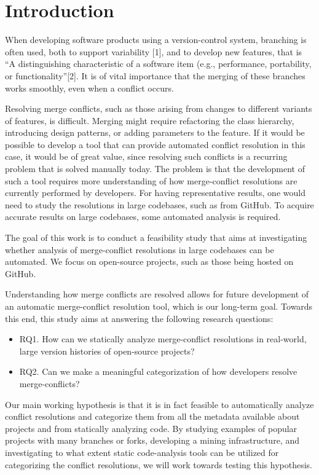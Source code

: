 \chapter{Introduction}
\setlength{\parindent}{0pt}
When developing software products using a version-control system, branching is often used, both to support variability [1], and to develop new features, that is “A distinguishing characteristic of a software item (e.g., performance, portability, or functionality”[2]. It is of vital importance that the merging of these branches works smoothly, even when a conflict occurs.

Resolving merge conflicts, such as those arising from changes to different variants of features, is difficult. Merging might require refactoring the class hierarchy, introducing design patterns, or adding parameters to the feature. If it would be possible to develop a tool that can provide automated conflict resolution in this case, it would be of great value, since resolving such conflicts is a recurring problem that is solved manually today. The problem is that the development of such a tool requires more understanding of how merge-conflict resolutions are currently performed by developers. For having representative results, one would need to study the resolutions in large codebases, such as from GitHub. To acquire accurate results on large codebases, some automated analysis is required.

The goal of this work is to conduct a feasibility study that aims at investigating whether analysis of merge-conflict resolutions in large codebases can be automated. We focus on open-source projects, such as those being hosted on GitHub.

Understanding how merge conflicts are resolved allows for future development of an automatic merge-conflict resolution tool, which is our long-term goal. Towards this end, this study aims at answering the following research questions:
\begin{itemize}
\item RQ1. How can we statically analyze merge-conflict resolutions in real-world, large version histories of open-source projects?
\item RQ2. Can we make a meaningful categorization of how developers resolve merge-conflicts?
\end{itemize}

Our main working hypothesis is that it is in fact feasible to automatically analyze conflict resolutions and categorize them from all the metadata available about projects and from statically analyzing code. By studying examples of popular projects with many branches or forks, developing a mining infrastructure, and investigating to what extent static code-analysis tools can be utilized for categorizing the conflict resolutions, we will work towards testing this hypothesis.

